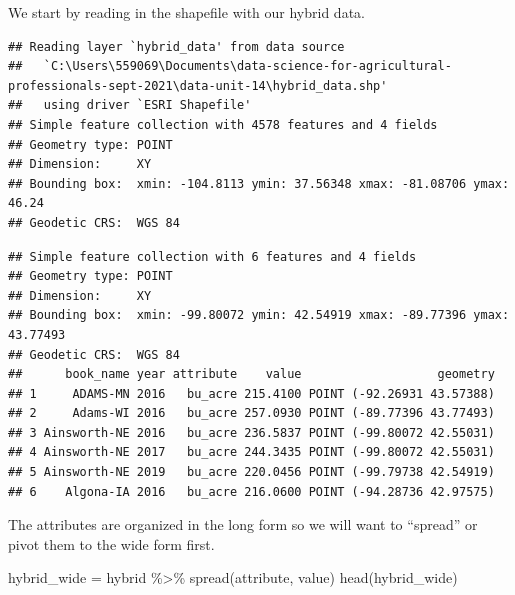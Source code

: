 \documentclass[
]{book}
\newenvironment{Shaded}{\begin{snugshade}}{\end{snugshade}}
\newcommand{\FunctionTok}[1]{\textcolor[rgb]{0.00,0.00,0.00}{#1}}
\newcommand{\NormalTok}[1]{#1}
\newcommand{\OtherTok}[1]{\textcolor[rgb]{0.56,0.35,0.01}{#1}}
\newcommand{\SpecialCharTok}[1]{\textcolor[rgb]{0.00,0.00,0.00}{#1}}
\begin{document}
We start by reading in the shapefile with our hybrid data.

\begin{verbatim}
## Reading layer `hybrid_data' from data source 
##   `C:\Users\559069\Documents\data-science-for-agricultural-professionals-sept-2021\data-unit-14\hybrid_data.shp' 
##   using driver `ESRI Shapefile'
## Simple feature collection with 4578 features and 4 fields
## Geometry type: POINT
## Dimension:     XY
## Bounding box:  xmin: -104.8113 ymin: 37.56348 xmax: -81.08706 ymax: 46.24
## Geodetic CRS:  WGS 84
\end{verbatim}

\begin{verbatim}
## Simple feature collection with 6 features and 4 fields
## Geometry type: POINT
## Dimension:     XY
## Bounding box:  xmin: -99.80072 ymin: 42.54919 xmax: -89.77396 ymax: 43.77493
## Geodetic CRS:  WGS 84
##      book_name year attribute    value                   geometry
## 1     ADAMS-MN 2016   bu_acre 215.4100 POINT (-92.26931 43.57388)
## 2     Adams-WI 2016   bu_acre 257.0930 POINT (-89.77396 43.77493)
## 3 Ainsworth-NE 2016   bu_acre 236.5837 POINT (-99.80072 42.55031)
## 4 Ainsworth-NE 2017   bu_acre 244.3435 POINT (-99.80072 42.55031)
## 5 Ainsworth-NE 2019   bu_acre 220.0456 POINT (-99.79738 42.54919)
## 6    Algona-IA 2016   bu_acre 216.0600 POINT (-94.28736 42.97575)
\end{verbatim}

The attributes are organized in the long form so we will want to ``spread'' or pivot them to the wide form first.

\begin{Shaded}
\begin{Highlighting}[]
\NormalTok{hybrid\_wide }\OtherTok{=}\NormalTok{ hybrid }\SpecialCharTok{\%\textgreater{}\%}
  \FunctionTok{spread}\NormalTok{(attribute, value)}
\FunctionTok{head}\NormalTok{(hybrid\_wide)}
\end{Highlighting}
\end{Shaded}
\end{document}
